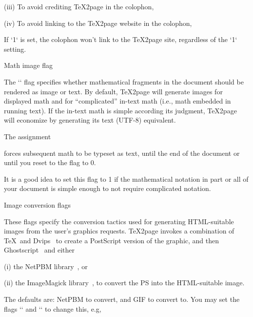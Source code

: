 \item(iii) To avoid crediting \TeX2page in the colophon,

\begintt
\let\TZPcolophondisablecredit=1
\endtt

\item(iv) To avoid linking to the \TeX2page website in the colophon,

\begintt
\let\TZPcolophondisableweblink=1
\endtt
%
If `\TZPcolophondisablecredit` is set, the colophon won’t link to the \TeX2page
site, regardless of the `\TZPcolophondisableweblink` setting.

\beginsection Math image flag

The `\TZPmathtext` flag
specifies whether mathematical fragments in the
document should be rendered as image or text.  By default, \TeX2page will
generate images for displayed math and for “complicated”
in-text math (i.e., math embedded in running text).   If the
in-text math is simple according its judgment, \TeX2page will
economize by generating its text (UTF-8) equivalent.

The assignment

\begintt
\let\TZPmathtext=1
\endtt
%
forces subsequent math to be typeset as text, until the end of the document or
until you reset to the flag to 0.

It is a good idea to set this flag to 1 if the
mathematical notation in part or all of your document is simple enough to
not require complicated notation.

\beginsection Image conversion flags

%
These flags specify the conversion tactics used
for generating HTML-suitable images from the user’s graphics
requests.  \TeX2page invokes a combination of \TeX\ and
Dvips~\cite{dvips} to create a PostScript version of the
graphic, and then Ghostscript~\cite{gs} and either \item(i) the
NetPBM library~\cite{netpbm}, or \item(ii) the ImageMagick
library~\cite{imagemagick}, to convert the PS into the
HTML-suitable image.

The defaults are: NetPBM
to convert, and GIF to convert to.
You may set the flags `\TZPimageconverter` and `\TZPimageformat` to
change this, e.g,

